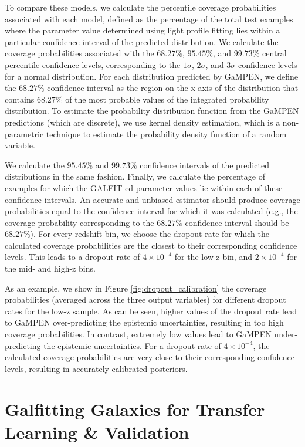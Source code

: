 \documentclass[linenumbers,twocolumn,twocolappendix]{aastex631}
\newcommand\gampen{GaMPEN}
\begin{document}
\begin{CJK*}{UTF8}{gbsn}
To compare these models, we calculate the percentile coverage probabilities associated with each model, defined as the percentage of the total test examples where the parameter value determined using light profile fitting lies within a particular confidence interval of the predicted distribution. We calculate the coverage probabilities associated with the $68.27\%$, $95.45\%$, and $99.73\%$ central percentile confidence levels, corresponding to the $1\sigma$, $2\sigma$, and $3\sigma$ confidence levels for a normal distribution. For each distribution predicted by \gampen{}, we define the $68.27\%$ confidence interval as the region on the x-axis of the distribution that contains $68.27\%$ of the most probable values of the integrated probability distribution. To estimate the probability distribution function from the \gampen{} predictions (which are discrete), we use kernel density estimation, which is a non-parametric technique to estimate the probability density function of a random variable. 

We calculate the $95.45\%$ and $99.73\%$ confidence intervals of the predicted distributions in the same fashion. Finally, we calculate the percentage of examples for which the GALFIT-ed parameter values lie within each of these confidence intervals. An accurate and unbiased estimator should produce coverage probabilities equal to the confidence interval for which it was calculated (e.g., the coverage probability corresponding to the $68.27\%$ confidence interval should be $68.27\%$). For every redshift bin, we choose the dropout rate for which the calculated coverage probabilities are the closest to their corresponding confidence levels. This leads to a dropout rate of $4\times10^{-4}$ for the low-z bin, and $2\times10^{-4}$ for the mid- and high-z bins. 

As an example, we show in Figure \ref{fig:dropout_calibration} the coverage probabilities (averaged across the three output variables) for different dropout rates for the low-z sample. As can be seen, higher values of the dropout rate lead to \gampen{} over-predicting the epistemic uncertainties, resulting in too high coverage probabilities. In contrast, extremely low values lead to \gampen{} under-predicting the epistemic uncertainties. For a dropout rate of $4\times10^{-4}$, the calculated coverage probabilities are very close to their corresponding confidence levels, resulting in accurately calibrated posteriors. 


\section{Galfitting Galaxies for Transfer Learning \& Validation} \label{sec:galfitting}


\end{CJK*}
\end{document}
